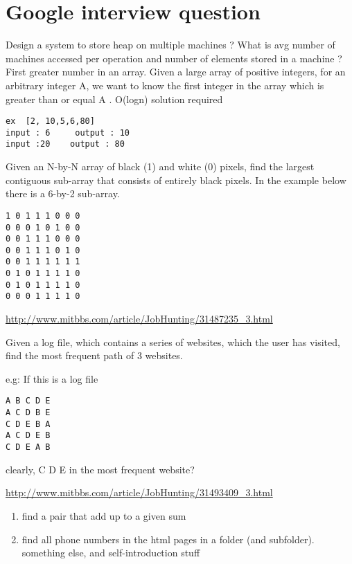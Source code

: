 \documentclass[12pt]{book}
\begin{document}
\chapter{Google interview question}
\label{sec-22}
Design a system to store heap on multiple machines ? What is avg number of 
machines accessed per operation and  number of elements stored in a machine ?
First greater number in an array. Given a large array of positive integers, 
for an arbitrary integer A, we want to know the first integer in the array 
which is greater than or equal A . O(logn) solution required
\lstset{language=java,label= ,caption= ,numbers=none}
\begin{lstlisting}
ex  [2, 10,5,6,80]
input : 6     output : 10
input :20    output : 80
\end{lstlisting}

Given an N-by-N array of black (1) and white (0) pixels, find the largest 
contiguous sub-array that consists of entirely black pixels. In the example 
below there is a 6-by-2 sub-array.

\lstset{language=java,label= ,caption= ,numbers=none}
\begin{lstlisting}
1 0 1 1 1 0 0 0
0 0 0 1 0 1 0 0
0 0 1 1 1 0 0 0
0 0 1 1 1 0 1 0
0 0 1 1 1 1 1 1
0 1 0 1 1 1 1 0
0 1 0 1 1 1 1 0
0 0 0 1 1 1 1 0
\end{lstlisting}

\url{http://www.mitbbs.com/article/JobHunting/31487235_3.html}

Given a log file, which contains a series of websites, which the user has 
visited, find the most frequent path of 3 websites.

e.g: If this is a log file
\lstset{language=java,label= ,caption= ,numbers=none}
\begin{lstlisting}
A B C D E
A C D B E
C D E B A
A C D E B
C D E A B
\end{lstlisting}

clearly, C D E in the most frequent website?

\url{http://www.mitbbs.com/article/JobHunting/31493409_3.html}

\begin{enumerate}
\item find a pair that add up to a given sum

\item find all phone numbers in the html pages in a folder (and subfolder). something else, and self-introduction stuff
\end{enumerate}
\end{document}
